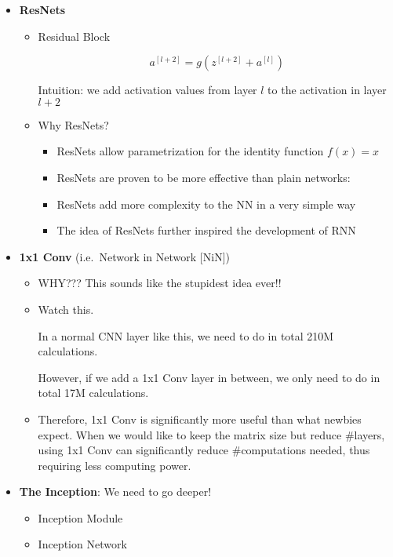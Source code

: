 \documentclass[
]{book}
\begin{document}
\begin{itemize}
\item
  \textbf{ResNets}

  \begin{itemize}
  \item
    Residual Block

    \[\begin{equation}
      a^{[l+2]}=g(z^{[l+2]}+a^{[l]})
      \end{equation}\]

    Intuition: we add activation values from layer \(l\) to the
    activation in layer \(l+2\)
  \item
    Why ResNets?

    \begin{itemize}
    \item
      ResNets allow parametrization for the identity function \(f(x)=x\)
    \item
      ResNets are proven to be more effective than plain networks:
    \item
      ResNets add more complexity to the NN in a very simple way
    \item
      The idea of ResNets further inspired the development of RNN\\
    \end{itemize}
  \end{itemize}
\item
  \textbf{1x1 Conv} (i.e.~Network in Network {[}NiN{]})

  \begin{itemize}
  \item
    WHY??? This sounds like the stupidest idea ever!!
  \item
    Watch this.

    In a normal CNN layer like this, we need to do in total 210M
    calculations.

    However, if we add a 1x1 Conv layer in between, we only need to do
    in total 17M calculations.
  \item
    Therefore, 1x1 Conv is significantly more useful than what newbies
    expect. When we would like to keep the matrix size but reduce
    \#layers, using 1x1 Conv can significantly reduce \#computations
    needed, thus requiring less computing power.\\
  \end{itemize}
\item
  \textbf{The Inception}: We need to go deeper!

  \begin{itemize}
  \item
    Inception Module
  \item
    Inception Network
  \end{itemize}
\end{itemize}
\end{document}
